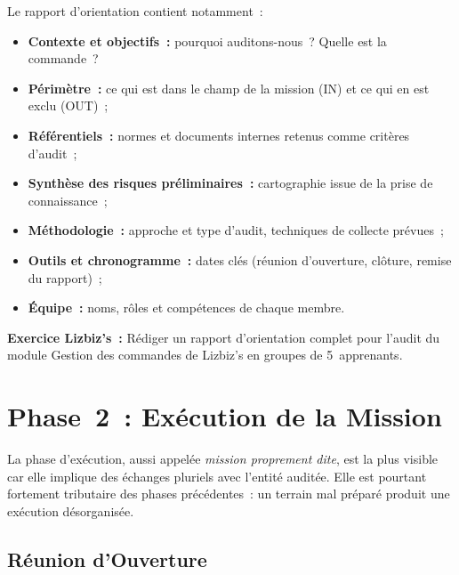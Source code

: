 Le rapport d'orientation contient notamment~:
\begin{itemize}
    \item \textbf{Contexte et objectifs~:} pourquoi auditons-nous~? Quelle est
        la commande~?
    \item \textbf{Périmètre~:} ce qui est dans le champ de la mission (IN) et ce
        qui en est exclu (OUT)~;
    \item \textbf{Référentiels~:} normes et documents internes retenus comme
        critères d'audit~;
    \item \textbf{Synthèse des risques préliminaires~:} cartographie issue de la
        prise de connaissance~;
    \item \textbf{Méthodologie~:} approche et type d'audit, techniques de collecte
        prévues~;
    \item \textbf{Outils et chronogramme~:} dates clés (réunion d'ouverture, clôture,
        remise du rapport)~;
    \item \textbf{Équipe~:} noms, rôles et compétences de chaque membre.
\end{itemize}

\begin{boxlizbiz}
\textbf{Exercice Lizbiz's~:}
Rédiger un rapport d'orientation complet pour l'audit du module \og{}Gestion des
commandes\fg{} de Lizbiz's en groupes de 5~apprenants.
\end{boxlizbiz}

\section{Phase~2~: Exécution de la Mission}
\label{sec:execution}

La phase d'exécution, aussi appelée \emph{mission proprement dite}, est la plus
visible car elle implique des échanges pluriels avec l'entité auditée. Elle est
pourtant fortement tributaire des phases précédentes~: un terrain mal préparé produit
une exécution désorganisée.

\subsection{Réunion d'Ouverture}
\label{subsec:reunion-ouverture}


